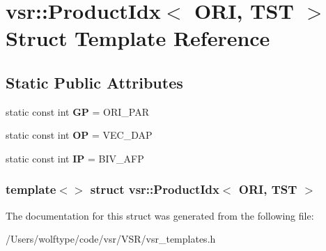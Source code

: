 \hypertarget{structvsr_1_1_product_idx_3_01_o_r_i_00_01_t_s_t_01_4}{\section{vsr\-:\-:Product\-Idx$<$ O\-R\-I, T\-S\-T $>$ Struct Template Reference}
\label{structvsr_1_1_product_idx_3_01_o_r_i_00_01_t_s_t_01_4}
}
\subsection*{Static Public Attributes}
\begin{DoxyCompactItemize}
\item 
\hypertarget{structvsr_1_1_product_idx_3_01_o_r_i_00_01_t_s_t_01_4_a74333f575e11541016de2f701095790c}{static const int {\bfseries G\-P} = O\-R\-I\-\_\-\-P\-A\-R}\label{structvsr_1_1_product_idx_3_01_o_r_i_00_01_t_s_t_01_4_a74333f575e11541016de2f701095790c}

\item 
\hypertarget{structvsr_1_1_product_idx_3_01_o_r_i_00_01_t_s_t_01_4_ad9a591905b417ce5bead682ac3bf80f4}{static const int {\bfseries O\-P} = V\-E\-C\-\_\-\-D\-A\-P}\label{structvsr_1_1_product_idx_3_01_o_r_i_00_01_t_s_t_01_4_ad9a591905b417ce5bead682ac3bf80f4}

\item 
\hypertarget{structvsr_1_1_product_idx_3_01_o_r_i_00_01_t_s_t_01_4_a5b251d48d5fc6a30984d46883a75d974}{static const int {\bfseries I\-P} = B\-I\-V\-\_\-\-A\-F\-P}\label{structvsr_1_1_product_idx_3_01_o_r_i_00_01_t_s_t_01_4_a5b251d48d5fc6a30984d46883a75d974}

\end{DoxyCompactItemize}
\subsubsection*{template$<$$>$ struct vsr\-::\-Product\-Idx$<$ O\-R\-I, T\-S\-T $>$}



The documentation for this struct was generated from the following file\-:\begin{DoxyCompactItemize}
\item 
/\-Users/wolftype/code/vsr/\-V\-S\-R/vsr\-\_\-templates.\-h\end{DoxyCompactItemize}
